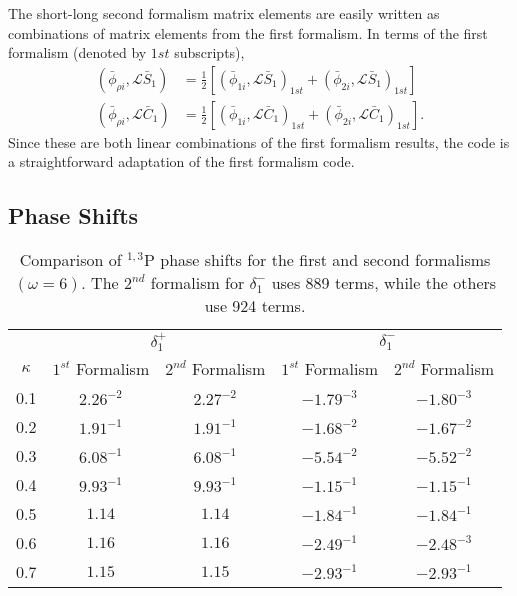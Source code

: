\documentclass[Dissertation.tex]{subfiles}
\begin{document}
The short-long second formalism matrix elements are easily written as
combinations of matrix elements from the first formalism. In terms of the first
formalism (denoted by $1st$ subscripts),
\begin{subequations}
\begin{align}
\left(\bar{\phi}_{\rho i},\mathcal{L} \bar{S}_1\right) &= \frac{1}{2} \left[ \left(\bar{\phi}_{1i},\mathcal{L} \bar{S}_1\right)_{1st} + \left(\bar{\phi}_{2i},\mathcal{L} \bar{S}_1\right)_{1st} \right] \\
\left(\bar{\phi}_{\rho i},\mathcal{L} \bar{C}_1\right) &= \frac{1}{2} \left[ \left(\bar{\phi}_{1i},\mathcal{L} \bar{C}_1\right)_{1st} + \left(\bar{\phi}_{2i},\mathcal{L} \bar{C}_1\right)_{1st} \right].
\end{align}
\end{subequations}
Since these are both linear combinations of the first formalism results,
the code is a straightforward adaptation of the first formalism code.


\subsection{Phase Shifts}
\label{sec:PWave2ndPhase}

\begin{table}
\centering
\begin{tabular}{c | c c | c c}
\toprule
\multicolumn{1}{c}{ } & \multicolumn{2}{c}{$\delta_1^+$} & \multicolumn{2}{c}{$\delta_1^-$} \\
$\kappa$ & $1^{st}$ Formalism & $2^{nd}$ Formalism & $1^{st}$ Formalism & $2^{nd}$ Formalism \\
\midrule
0.1 & $2.26^{-2}$ & $2.27^{-2}$ & $-1.79^{-3}$ & $-1.80^{-3}$ \\
0.2 & $1.91^{-1}$ & $1.91^{-1}$ & $-1.68^{-2}$ & $-1.67^{-2}$ \\
0.3 & $6.08^{-1}$ & $6.08^{-1}$ & $-5.54^{-2}$ & $-5.52^{-2}$ \\
0.4 & $9.93^{-1}$ & $9.93^{-1}$ & $-1.15^{-1}$ & $-1.15^{-1}$ \\
0.5 & $1.14$      & $1.14$      & $-1.84^{-1}$ & $-1.84^{-1}$ \\
0.6 & $1.16$      & $1.16$      & $-2.49^{-1}$ & $-2.48^{-3}$ \\
0.7 & $1.15$      & $1.15$      & $-2.93^{-1}$ & $-2.93^{-1}$ \\
\bottomrule
\end{tabular}
\caption[Comparison of $^{1,3}$P phase shifts for the first and second formalisms]{Comparison of $^{1,3}$P phase shifts for the first and second formalisms $(\omega = 6)$. The $2^{nd}$ formalism for $\delta_1^-$ uses 889 terms, while the others use 924 terms.}
\label{tab:PWaveFormalPhase}
\end{table}
\end{document}
